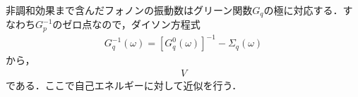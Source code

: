 非調和効果まで含んだフォノンの振動数はグリーン関数$G_q$の極に対応する．すなわち$G_p^{-1}$のゼロ点なので，ダイソン方程式
 \begin{align}
  G_q^{-1}(\omega)= \left[ G_q^{0}(\omega)\right]^{-1}-\Sigma_{q}(\omega)
 \end{align}
 から，
 \begin{align}
  V
 \end{align}
 である．ここで自己エネルギーに対して近似を行う．
